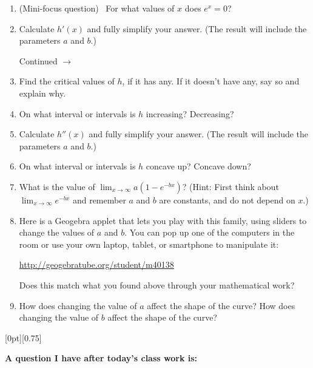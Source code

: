 \documentclass[11pt]{article}
\newcommand{\cuthere}{%
\noindent
\raisebox{-2.8pt}[0pt][0.75\baselineskip]{\small\ding{34}}
\unskip{\tiny\dotfill}
}
\def\ra{\rightarrow}
\def\pageturn{\vfill 
\begin{flushright}
	\begin{small}
		Continued $\ra$
	\end{small}
\end{flushright} \newpage}
\begin{document}
\begin{enumerate}
	\item (Mini-focus question) \ For what values of $x$ does $e^x = 0$? 
	\vspace{0.4in}
	
	\item Calculate $h'(x)$ and fully simplify your answer. (The result will include the parameters $a$ and $b$.) 
	
	\pageturn
	
	
	\item Find the critical values of $h$, if it has any. If it doesn't have any, say so and explain why. 
	\vspace{0.5in}
	
	\item On what interval or intervals is $h$ increasing? Decreasing? 
	\vspace{0.7in}
	
	
	\item Calculate $h''(x)$ and fully simplify your answer. (The result will include the parameters $a$ and $b$.) 
	\vspace{1in}
	
	\item On what interval or intervals is $h$ concave up? Concave down?
	\vspace{0.5in}
	
	
	\item What is the value of $\displaystyle{\lim_{x \to \infty} a(1-e^{-bx}) }$?  (Hint: First think about $\displaystyle{\lim_{x \to \infty} e^{-bx} }$ and remember $a$ and $b$ are constants, and do not depend on $x$.)
	\vspace{0.7in}
	
	\item Here is a Geogebra applet that lets you play with this family, using sliders to change the values of $a$ and $b$. You can pop up one of the computers in the room or use your own laptop, tablet, or smartphone to manipulate it: 
	\begin{center}
		\url{http://geogebratube.org/student/m40138}
	\end{center}
	Does this match what you found above through your mathematical work? 
	
	\item How does changing the value of $a$ affect the shape of the curve? How does changing the value of $b$ affect the shape of the curve? 
	
	
	
\end{enumerate}

\vfill 

\cuthere

\noindent
\textbf{A question I have after today's class work is:}

\vspace{1in}
\end{document}
